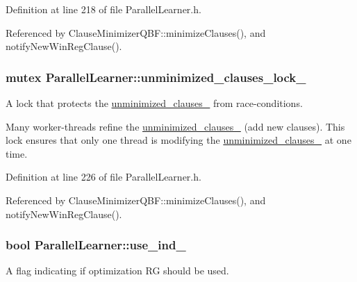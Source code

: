 Definition at line 218 of file Parallel\-Learner.\-h.



Referenced by Clause\-Minimizer\-Q\-B\-F\-::minimize\-Clauses(), and notify\-New\-Win\-Reg\-Clause().

\hypertarget{classParallelLearner_aa16d364d9fdd0c2fe5180ee1b023a4ec}{
\subsubsection[{unminimized\-\_\-clauses\-\_\-lock\-\_\-}]{\setlength{\rightskip}{0pt plus 5cm}mutex Parallel\-Learner\-::unminimized\-\_\-clauses\-\_\-lock\-\_\-}}\label{classParallelLearner_aa16d364d9fdd0c2fe5180ee1b023a4ec}


A lock that protects the \hyperlink{classParallelLearner_aba6b363071d9a39d7b368cec5b629c25}{unminimized\-\_\-clauses\-\_\-} from race-\/conditions. 

Many worker-\/threads refine the \hyperlink{classParallelLearner_aba6b363071d9a39d7b368cec5b629c25}{unminimized\-\_\-clauses\-\_\-} (add new clauses). This lock ensures that only one thread is modifying the \hyperlink{classParallelLearner_aba6b363071d9a39d7b368cec5b629c25}{unminimized\-\_\-clauses\-\_\-} at one time. 

Definition at line 226 of file Parallel\-Learner.\-h.



Referenced by Clause\-Minimizer\-Q\-B\-F\-::minimize\-Clauses(), and notify\-New\-Win\-Reg\-Clause().

\hypertarget{classParallelLearner_aebaf891aada574da650732795f041dbe}{
\subsubsection[{use\-\_\-ind\-\_\-}]{\setlength{\rightskip}{0pt plus 5cm}bool Parallel\-Learner\-::use\-\_\-ind\-\_\-\hspace{0.3cm}{\ttfamily [protected]}}}\label{classParallelLearner_aebaf891aada574da650732795f041dbe}


A flag indicating if optimization R\-G should be used. 

